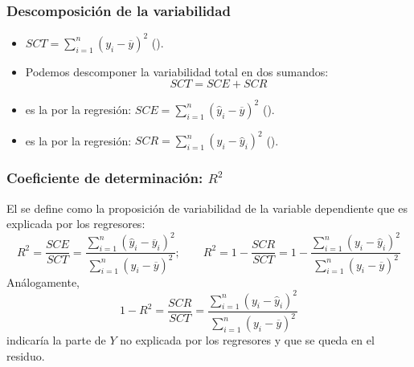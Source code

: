 \subsubsection{Descomposición de la variabilidad}
\begin{itemize}
	\item {} $SCT=\sum_{i=1}^{n}(y_i-\overline{y})^2$ ().
	\item Podemos descomponer la variabilidad total en dos sumandos: \[ SCT=SCE+SCR \]
	\item {} es la  por la regresión: $SCE=\sum_{i=1}^{n}(\hat{y}_i-\overline{y})^2$ ().
	\item {} es la  por la regresión: $SCR=\sum_{i=1}^{n}(y_i-\hat{y}_i)^2$ ().
\end{itemize}
\subsubsection{Coeficiente de determinación: $R^2$}
El  se define como la proposición de variabilidad de la variable dependiente que es explicada por los regresores: \[  R^2=\dfrac{SCE}{SCT}=\dfrac{\displaystyle\sum_{i=1}^{n}(\hat{y}_i-\overline{y}_i)^2}{\displaystyle\sum_{i=1}^{n}(y_i-\overline{y})^2};\qquad R^2=1-\dfrac{SCR}{SCT}=1-\dfrac{\displaystyle\sum_{i=1}^{n}(y_i-\hat{y}_i)^2}{\displaystyle\sum_{i=1}^{n}(y_i-\overline{y})^2} \]
Análogamente, \[ 1-R^2=\dfrac{SCR}{SCT}=\dfrac{\displaystyle\sum_{i=1}^{n}(y_i-\hat{y}_i)^2}{\displaystyle\sum_{i=1}^{n}(y_i-\overline{y})^2} \]indicaría la parte de $Y$ no explicada por los regresores y que se queda en el residuo.
